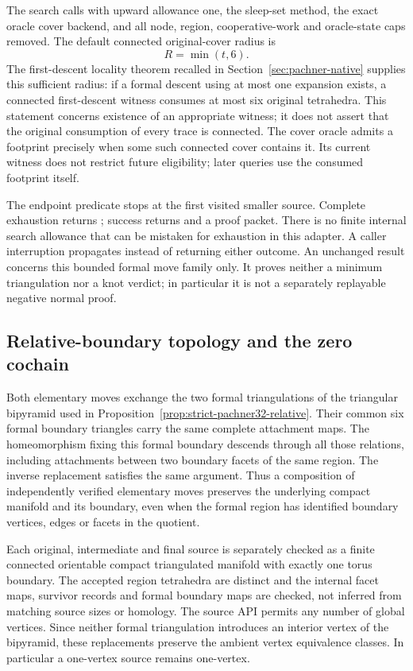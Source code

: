 The search calls  with upward allowance one,
the sleep-set method, the exact oracle cover backend, and all node,
region, cooperative-work and oracle-state caps removed.  The default
connected original-cover radius is
\[
                              R=\min(t,6).
\]
The first-descent locality theorem recalled in
Section~\ref{sec:pachner-native} supplies this sufficient radius:
if a formal descent using at most one expansion exists, a connected
first-descent witness consumes at most six original tetrahedra.
This statement concerns existence of an appropriate witness; it does
not assert that the original consumption of every trace is connected.
The cover oracle admits a footprint precisely when some such connected
cover contains it.  Its current witness does not restrict future
eligibility; later queries use the consumed footprint itself.

The endpoint predicate stops at the first visited smaller source.
Complete exhaustion returns ; success returns
 and a proof packet.  There is no finite internal search
allowance that can be mistaken for exhaustion in this adapter.
A caller interruption propagates instead of returning either outcome.
An unchanged result concerns this bounded formal move family only.
It proves neither a minimum triangulation nor a knot verdict; in
particular it is not a separately replayable negative normal proof.

\subsection{Relative-boundary topology and the zero cochain}

Both elementary moves exchange the two formal triangulations of the
triangular bipyramid used in
Proposition~\ref{prop:strict-pachner32-relative}.  Their common six
formal boundary triangles carry the same complete attachment maps.
The homeomorphism fixing this formal boundary descends through all
those relations, including attachments between two boundary facets of
the same region.  The inverse replacement satisfies the same argument.
Thus a composition of independently verified elementary moves preserves
the underlying compact manifold and its boundary, even when the formal
region has identified boundary vertices, edges or facets in the quotient.

Each original, intermediate and final source is separately checked as
a finite connected orientable compact triangulated manifold with exactly
one torus boundary.  The accepted region tetrahedra are distinct and
the internal facet maps, survivor records and formal boundary maps are
checked, not inferred from matching source sizes or homology.  The
source API permits any number of global vertices.  Since neither
formal triangulation introduces an interior vertex of the bipyramid,
these replacements preserve the ambient vertex equivalence classes.
In particular a one-vertex source remains one-vertex.

